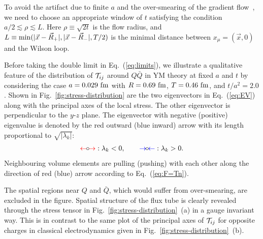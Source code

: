 \documentclass[3p,twocolumn,sort&compress]{elsarticle}
\newcommand{\red}[1]{\textcolor{red}{#1}}
\newcommand{\blue}[1]{\textcolor{blue}{#1}}
\begin{document}
To avoid the artifact due to finite $a$ and
the over-smearing of the gradient flow~\cite{Kitazawa:2016dsl,Kitazawa:2017qab},
we need to choose an  appropriate window of $t$ satisfying the 
 condition  ${a}/{2} \lesssim  \rho  \lesssim L$.
 Here $\rho \equiv \sqrt{{2t}}$ is the flow radius, and 
$L\equiv {\rm min} (|\vec{x}-\vec{R}_{+}|, |\vec{x}-\vec{R}_{-}|, T/2)$
is the minimal distance between $x_{\mu}=(\vec{x},0)$ and the Wilson loop.

Before taking the double limit in Eq.~(\ref{eq:limits}), we 
illustrate a qualitative feature of
 the distribution of ${\cal T}_{ij}$ around  $Q\bar{Q}$ in YM theory
at fixed $a$ and $t$ by considering the case $a =0.029\ {\rm fm}$
with $R=0.69\ {\rm fm}$, $T=0.46\ {\rm fm}$, and $t/{a}^2 = 2.0$.
Shown in Fig.~\ref{fig:stress-distribution}  are
 the two eigenvectors in Eq.~(\ref{eq:EV}) along with the principal axes of the local stress. 
 The other eigenvector is perpendicular to the   $y$-$z$ plane.
 The eigenvector with negative (positive) eigenvalue 
   is   denoted by the red outward (blue inward) arrow with its length proportional to $\sqrt{|\lambda_k |}$:
\begin{eqnarray}
 \red{\leftarrow} \hspace{-0.05cm} {\tiny{\circ}} \hspace{-0.05cm}  \red{\rightarrow} : \lambda_k<0, 
 \qquad  \blue{\rightarrow} \hspace{-0.05cm}  {\tiny{\circ}}  \hspace{-0.05cm}  \blue{\leftarrow}: \lambda_k>0.
\end{eqnarray}
Neighbouring volume elements  are pulling (pushing) with each other along the direction of
   red (blue) arrow according to Eq.~(\ref{eq:F=Tn}).
   
The spatial regions near $Q$ and $\bar{Q}$, which 
would suffer from over-smearing, are excluded in the figure.
Spatial structure of the flux tube is clearly
revealed through the 
stress tensor in Fig.~\ref{fig:stress-distribution}~(a) in a gauge 
invariant way.
This is in contrast to the same plot of the principal axes of ${\cal T}_{ij}$
for opposite charges in classical electrodynamics given in Fig.~\ref{fig:stress-distribution}~(b).
\end{document}
